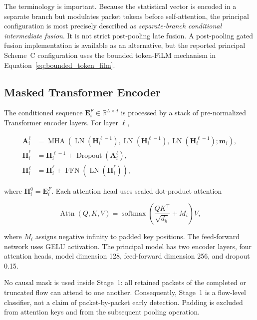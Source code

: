 \documentclass[11pt,fleqn]{report}
\begin{document}
The terminology is important. Because the statistical vector is encoded in a
separate branch but modulates packet tokens before self-attention, the principal
configuration is most precisely described as \emph{separate-branch conditional
intermediate fusion}. It is not strict post-pooling late fusion. A post-pooling
gated fusion implementation is available as an alternative, but the reported
principal Scheme~C configuration uses the bounded token-FiLM mechanism in
Equation~\ref{eq:bounded_token_film}.

\subsection{Masked Transformer Encoder}
\label{subsubsec:stage1_transformer}

The conditioned sequence
$\mathbf{E}^{F}_i\in\mathbb{R}^{L\times d}$ is processed by a stack of
pre-normalized Transformer encoder layers. For layer $\ell$,

\begin{align}
    \mathbf{A}^{\ell}_i
    &=\operatorname{MHA}
      \left(
        \operatorname{LN}(\mathbf{H}^{\ell-1}_i),
        \operatorname{LN}(\mathbf{H}^{\ell-1}_i),
        \operatorname{LN}(\mathbf{H}^{\ell-1}_i);
        \mathbf{m}_i
      \right),\\
    \overline{\mathbf{H}}^{\ell}_i
    &=\mathbf{H}^{\ell-1}_i
      +\operatorname{Dropout}(\mathbf{A}^{\ell}_i),\\
    \mathbf{H}^{\ell}_i
    &=\overline{\mathbf{H}}^{\ell}_i
      +\operatorname{FFN}
       \left(\operatorname{LN}(\overline{\mathbf{H}}^{\ell}_i)\right),
    \label{eq:stage1_transformer_layer}
\end{align}

where $\mathbf{H}^{0}_i=\mathbf{E}^{F}_i$. Each attention head uses scaled
dot-product attention

\begin{equation}
    \operatorname{Attn}(Q,K,V)
    =\operatorname{softmax}
      \left(
        \frac{QK^{\top}}{\sqrt{d_h}}+M_i
      \right)V,
    \label{eq:scaled_dot_product_attention}
\end{equation}

where $M_i$ assigns negative infinity to padded key positions. The feed-forward
network uses GELU activation. The principal model has two encoder layers, four
attention heads, model dimension 128, feed-forward dimension 256, and dropout
0.15.

No causal mask is used inside Stage~1: all retained packets of the completed or
truncated flow can attend to one another. Consequently, Stage~1 is a
flow-level classifier, not a claim of packet-by-packet early detection. Padding
is excluded from attention keys and from the subsequent pooling operation.
\end{document}
